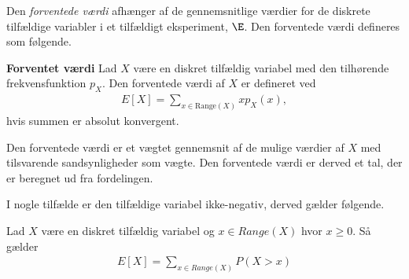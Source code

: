



Den \textit{forventede værdi} afhænger af de gennemsnitlige værdier for de diskrete tilfældige variabler i et tilfældigt eksperiment, $\E$. Den forventede værdi defineres som følgende.




\begin{minipage}\textwidth
\begin{defn}\textbf{Forventet værdi} \label{def:Forventetværdi} %
\newline
Lad $X$ være en diskret tilfældig variabel med den tilhørende frekvensfunktion $p_X$. Den forventede værdi af $X$ er defineret ved
\begin{align}
E[X]=\sum_{x\in \text{Range}(X)} x p_X(x),
\end{align}
hvis summen er absolut konvergent.
\end{defn}
\end{minipage}

Den forventede værdi er et vægtet gennemsnit af de mulige værdier af $X$ med tilsvarende sandsynligheder som vægte. Den forventede værdi er derved et tal, der er beregnet ud fra fordelingen.

\iffalse
I nogle tilfælde er den tilfældige variabel ikke-negativ, derved gælder følgende.


\begin{minipage}\textwidth
\begin{thmx} \textbf{} \label{sæt:forventet_værdi_x_større_end_nul}%
\newline
Lad $X$ være en diskret tilfældig variabel og 
$x\in Range(X)$ hvor $x\geq0$. Så gælder
\begin{align*}
    E[X]=\sum_{x\in Range(X)} P(X > x)
\end{align*}
\end{thmx}
\end{minipage}


